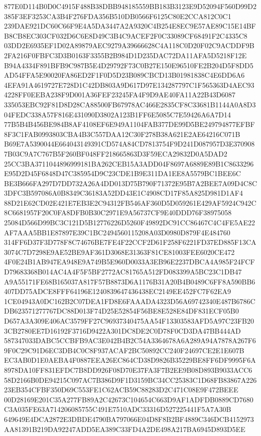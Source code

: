 \documentclass[UTF8,fontset=fandol,zihao=-4,a4paper]{ctexart}
\begin{document}
{{877E0D114B0D0C4915F488B38DBB948185559BB183B3123E9D52094F560D99D2385F3EF3253CA3B4F276FDA356B510DB0566F6125C80E2CCA812C0C1
239DAE921DC60C66F9E4A5DA3447A2A9320C4B254E8EC9E57AE89C15E14BFB8CB8EC303CF032D6C6E8D49C3B4C9ACEF2F0C33089CF68491F2C4335C8
03DD2E6935EF1D02A89879AEC9279A39666628C4A118C0D20F02C9ACDDF9B2FA216F0FBFC3D3B0163F3355B2B984D1D235DAC72DA11AFA5D5218F12E
B94A4334F891BFB9C987B5E4D29792F73C0B27E150E96510FE2B204D5F8DD5AD54FFA5E90020FA86ED2F1F0D5D23B089CBCD13B01981838C4E6DD6A6
4EFA91A4619727E728D1C42DB803A9D617D97E134287797C1F565363D4AEC934228FF0EEBA238F9D001A36FEF23245FA4F9D9AE40FA11A22B43D6087
335053EBC92F81D8D28CA88500FB67978AC466E2835CF8C33681B1144A0A8D304FEDC338A57F816E431090D3802A123B1FF6E5085C7E59426A6A7D14
77B5B4B456BE984B8AF4108EF6E949A1104FAB377DE99D5BE249794877EFBF8F3C1FAB0993803CBA4B3C557DAA12C30F278B38A621E2AE64216C071B
B69E7A5390044E664043149391CD574A84CD7813754F9D241D087957D3E3709087B03C9A7C767B5F260BF048FF218665863D3F59ECA29832D0A5DAD2
25CC3BA3711044896999181BA262CEB15A3ADD04F8697A6889E89B1C8633296E95D2D45F6848D47C385954D9C23CDE1B9E311DA1EE8A5579BC1BEE6C
BE3B666FA297D7DD732A26A4DD013D75B790F71372E95B7A2BEE7A09D4C8C3DFC3B597086A0B8349C36183A52DD43E1C4908CD17F85A825D981D1AF4
88D21E62CD02E421E7EB3E2C94312FB546AF360D5D059261E429AF5924C942C8C6681957F20C0FA8DFB0B30C2971E9A56737CF9E40DDD76F38975058
25084D566D99BC3C121D5B12776226D5260F49892DC91CC86467C4C4FE5AE22AF7AAA5BB1E87897E39C1BC2494560115208A03D0980D879F4E484760
314FF6D37F3D778F8C74676BE7FE4F22CCF2D61F258F6221FD37ED885F13CA3074C7D7298E9AE52BE9AF361D3068E31363F81CE81003FEE6020CE472
4F0E24B1AB947EA948E9A749B5E960D0033A3EB96E2237DBCA4A985F24FCFD79683368B014AC4A4F5F5BF2772AC81765A512FD083399A5BC23C1DB47
A9A55171FE68B165037A817F57B8873D6A1176B31A20B4B0489C6FF8A590BB6407DD75ADCE8FFF64196E1240839647436438EC2149EE452FC7F62EA9
1CE04943A0DC162B2C07DEA1FD8E6FAAADA4323D56A69742340E487B6786CDB623571277767DC88D013F74D25E52854F56BE8E528E84DF831ECF05B0
D657A3A309E406AC3579FF27C96937340475AA54F13303583AFD5A97C23FB203CB2780EE7D16192F3716D9422A301DC8DE2C0D78F0CD3DA47BB444AD
587347033DABC5CCBFB9AC3E042B4B2C54A3364678A6A289A94A7878A267F69F0C29C91D6EC3DB4C0C8F937ACAF2BC50892CC240F24697CE2E1E607B
EC3AB0D1E0AEBA4F0887EEA26EC864CD38D9826B35229BE8FF6DF9995F6A8978DA10FF831EFDC7B8DD926F08D70E37FA3F7B2EE9B08D893B9033ACC6
58D2166B0DE94215C097AC7B386D9F1D3159BC34CC25383C1D68FB83867A22623EB354CFBF350D69C553FE1C62ACB59C88283D2C471C08E9F472BEEE
00D28169E201C35A277FB89A2C42673C104654C663D9AF1ADFDB0889CD7680C3A035FE63A714206085755C491E7510ADC33316D527225441F5A7A30B
649649E4DCA2872E3DBDE4790BA797066E04D8F8B2BF4889C346DCB4152973AA81391B219DA92247ADD5EA389C33FD4A2DE498A217BA6945D893D5EE
}}
\end{document}
